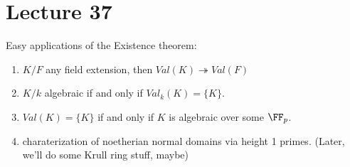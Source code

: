  \section{Lecture 37}

 Easy applications of the Existence theorem:
 \begin{enumerate}
   \item $K/F$ any field extension, then $Val(K)\twoheadrightarrow Val(F)$
   \item $K/k$ algebraic if and only if $Val_k(K)=\{K\}$.
   \item $Val(K)=\{K\}$ if and only if $K$ is algebraic over some $\FF_p$.
   \item charaterization of noetherian normal domains via height 1 primes. (Later, we'll
   do some Krull ring stuff, maybe)
 \end{enumerate}

